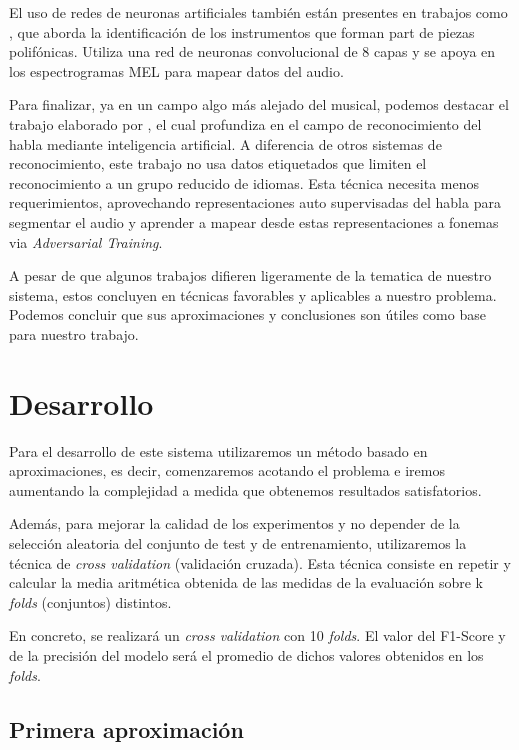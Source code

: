 \documentclass[12pt]{article}
\begin{document}
\bigskip
El uso de redes de neuronas artificiales también están presentes en trabajos como \cite{solanki2019music}, que aborda la identificación de
los instrumentos que forman part de piezas polifónicas. Utiliza una red de neuronas convolucional de 8 capas y se apoya en los espectrogramas 
MEL para mapear datos del audio.

\bigskip
Para finalizar, ya en un campo algo más alejado del musical, podemos destacar el trabajo elaborado por \cite{baevski2021unsupervised},
el cual profundiza en el campo de reconocimiento del habla mediante inteligencia artificial.
A diferencia de otros sistemas de reconocimiento, este trabajo no usa datos etiquetados que limiten el reconocimiento a un grupo reducido de idiomas. 
Esta técnica necesita menos requerimientos, aprovechando representaciones auto supervisadas del habla para segmentar el audio y aprender a 
mapear desde estas representaciones a fonemas via \textit{Adversarial Training}.

\bigskip
A pesar de que algunos trabajos difieren ligeramente de la tematica de nuestro sistema, estos concluyen en técnicas favorables y aplicables a nuestro
 problema. Podemos concluir que sus aproximaciones y conclusiones son útiles como base para nuestro trabajo.

\bigskip

\newpage
\section{Desarrollo}
\label{Desarrollo}
Para el desarrollo de este sistema utilizaremos un método basado en aproximaciones, es decir, comenzaremos acotando el problema e iremos aumentando
la complejidad a medida que obtenemos resultados satisfatorios.

\bigskip
Además, para mejorar la calidad de los experimentos y no depender de la selección aleatoria del conjunto de test y de entrenamiento, utilizaremos
la técnica de \textit{cross validation} (validación cruzada). Esta técnica consiste en repetir y calcular la media aritmética obtenida de las medidas de la evaluación 
sobre k \textit{folds} (conjuntos) distintos.

En concreto, se realizará un \textit{cross validation} con 10 \textit{folds}. El valor del F1-Score y de la precisión
del modelo será el promedio de dichos valores obtenidos en los \textit{folds}.

\subsection{Primera aproximación}
\label{Primera aproximación}
\end{document}
